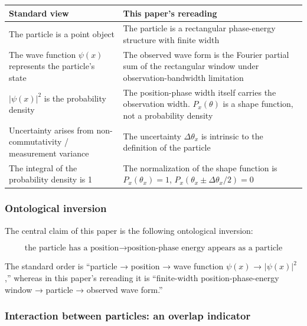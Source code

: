 \documentclass[
]{article}
\newcounter{none} %
\begin{document}
{\def\LTcaptype{none} %
\begin{longtable}[]{@{}
  >{\raggedright\arraybackslash}p{}
  >{\raggedright\arraybackslash}p{}@{}}
\toprule\noalign{}
\begin{minipage}[b]{\linewidth}\raggedright
Standard view
\end{minipage} & \begin{minipage}[b]{\linewidth}\raggedright
This paper's rereading
\end{minipage} \\
\midrule\noalign{}
\endhead
\bottomrule\noalign{}
\endlastfoot
The particle is a point object & The particle is a rectangular
phase-energy structure with finite width \\
The wave function \(\psi(x)\) represents the particle's state & The
observed wave form is the Fourier partial sum of the rectangular window
under observation-bandwidth limitation \\
\(\lvert\psi(x)\rvert^2\) is the probability density & The
position-phase width itself carries the observation width.
\(P_x(\theta)\) is a shape function, not a probability density \\
Uncertainty arises from non-commutativity / measurement variance & The
uncertainty \(\Delta\theta_x\) is intrinsic to the definition of the
particle \\
The integral of the probability density is 1 & The normalization of the
shape function is \(P_x(\theta_x) = 1\),
\(P_x(\theta_x \pm \Delta\theta_x/2) = 0\) \\
\end{longtable}
}

\subsubsection{Ontological inversion}\label{ontological-inversion}

The central claim of this paper is the following ontological inversion:

\[
\boxed{\text{the particle has a position} \longrightarrow \text{position-phase energy appears as a particle}}
\]

The standard order is ``particle → position → wave function \(\psi(x)\)
→ \(|\psi(x)|^2\),'' whereas in this paper's rereading it is
``finite-width position-phase-energy window → particle → observed wave
form.''

\subsubsection{Interaction between particles: an overlap
indicator}\label{interaction-between-particles-an-overlap-indicator}
\end{document}
